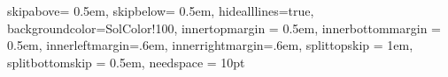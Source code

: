 \let\olddate\date
\renewcommand{\date}{\vspace{-20pt}\olddate}

\usepackage{xcolor}
\usepackage{amsthm}
\usepackage{thmtools}
\usepackage{booktabs}
\usepackage{longtable}
\usepackage{array}
\usepackage{hyperref}
\usepackage[framemethod=tikz]{mdframed}


 {
  skipabove= 0.5em,
  skipbelow= 0.5em,
  hidealllines=true,
  backgroundcolor={SolColor!100},
  innertopmargin = 0.5em,
  innerbottommargin = 0.5em,
  innerleftmargin=.6em,
  innerrightmargin=.6em,
  splittopskip = 1em,
  splitbottomskip = 0.5em,
  needspace = 10pt}

\newenvironment{solbox}
  {\begin{mdframed}[style = mystyle]}
  {\end{mdframed}}

 